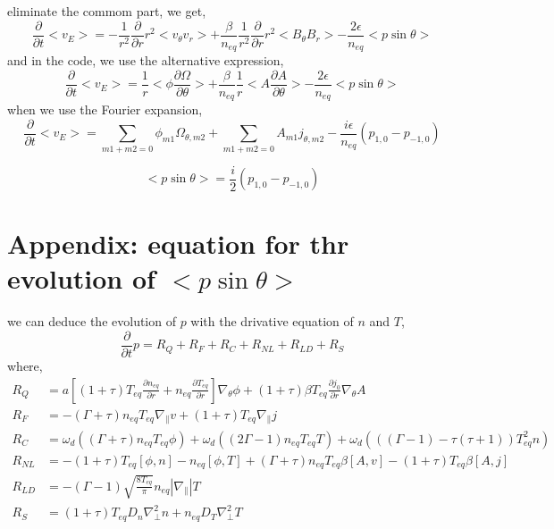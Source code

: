 \documentclass[11pt,a4paper]{article}
\begin{document}
	eliminate the commom part, we get,
	\begin{equation}
		\frac{\partial}{\partial{t}}<v_E>
		=-\frac{1}{r^2}\frac{\partial}{\partial{r}}r^2<v_\theta{v_r}>
		+\frac{\beta}{n_{eq}}\frac{1}{r^2}\frac{\partial}{\partial{r}}r^2<B_\theta{B_r}>
		-\frac{2\epsilon}{n_{eq}}<p\sin\theta>
	\end{equation} 
	and in the code, we use the alternative expression,
	\begin{equation}
		\frac{\partial}{\partial{t}}<v_E>
		=\frac{1}{r}<\phi\frac{\partial{\Omega}}{\partial\theta}>
		+\frac{\beta}{n_{eq}}\frac{1}{r}<A\frac{\partial{A}}{\partial\theta}>
		-\frac{2\epsilon}{n_{eq}}<p\sin\theta>
	\end{equation} 
	when we use the Fourier expansion,
	\begin{equation}
		\frac{\partial}{\partial{t}}<v_E>
		=\sum_{m1+m2=0}{\phi_{m1}}{\Omega_{\theta,m2}}
		+\sum_{m1+m2=0}{A_{m1}}{j_{\theta,m2}}
		-\frac{i\epsilon}{n_{eq}}(p_{1,0}-p_{-1,0})
	\end{equation}
	
	\begin{equation}
		<p\sin\theta>=\frac{i}{2}(p_{1,0}-p_{-1,0})
	\end{equation}
	

\section{Appendix: equation for thr evolution of $<p\sin\theta>$}
	we can deduce the evolution of $p$ with the drivative equation of $n$ and $T$,
	\begin{equation}
		\frac{\partial}{\partial{t}}p
		=R_Q+R_F+R_C+R_{NL}+R_{LD}+R_{S}
	\end{equation}
	where,
	\begin{equation}
	\begin{aligned}
	R_Q&=
	a[(1+\tau)T_{eq}\frac{\partial{n_{eq}}}{\partial{r}}+n_{eq}\frac{\partial{T_{eq}}}{\partial{r}}]\nabla_\theta\phi
	+(1+\tau)\beta{T_{eq}}\frac{\partial{j_0}}{\partial{r}}\nabla_\theta{A}	\\
	R_F&=
	-(\Gamma+\tau)n_{eq}T_{eq}\nabla_{\parallel}v
	+(1+\tau)T_{eq}\nabla_\parallel{j}	\\
	R_C&=
	\omega_d((\Gamma+\tau)n_{eq}T_{eq}\phi)
	+\omega_d((2\Gamma-1)n_{eq}T_{eq}T)
	+\omega_d(((\Gamma-1)-\tau(\tau+1))T_{eq}^2n)	\\
	R_{NL}&=
	-(1+\tau)T_{eq}[\phi,n]
	-n_{eq}[\phi,T]
	+(\Gamma+\tau)n_{eq}T_{eq}\beta[A,v]
	-(1+\tau)T_{eq}\beta[A,j]	\\
	R_{LD}&=
	-(\Gamma-1)\sqrt{\frac{8T_{eq}}{\pi}}n_{eq}|\nabla_\parallel|T	\\
	R_{S}&=
	(1+\tau)T_{eq}D_n\nabla_\perp^2n
	+n_{eq}D_T\nabla_\perp^2{T}
	\end{aligned}
	\end{equation}
	
\end{document}
